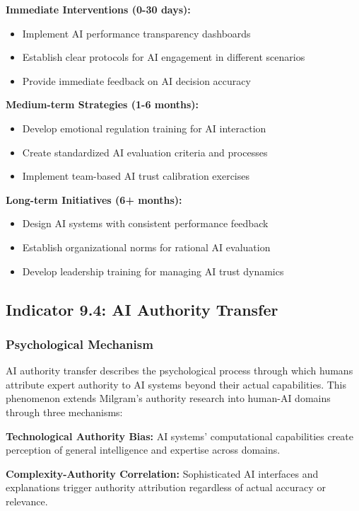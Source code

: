 \documentclass[11pt,a4paper]{article}
\begin{document}
\textbf{Immediate Interventions (0-30 days):}
\begin{itemize}
\item Implement AI performance transparency dashboards
\item Establish clear protocols for AI engagement in different scenarios
\item Provide immediate feedback on AI decision accuracy
\end{itemize}

\textbf{Medium-term Strategies (1-6 months):}
\begin{itemize}
\item Develop emotional regulation training for AI interaction
\item Create standardized AI evaluation criteria and processes
\item Implement team-based AI trust calibration exercises
\end{itemize}

\textbf{Long-term Initiatives (6+ months):}
\begin{itemize}
\item Design AI systems with consistent performance feedback
\item Establish organizational norms for rational AI evaluation
\item Develop leadership training for managing AI trust dynamics
\end{itemize}

\subsection{Indicator 9.4: AI Authority Transfer}

\subsubsection{Psychological Mechanism}

AI authority transfer describes the psychological process through which humans attribute expert authority to AI systems beyond their actual capabilities. This phenomenon extends Milgram's\cite{milgram1974} authority research into human-AI domains through three mechanisms:

\textbf{Technological Authority Bias:} AI systems' computational capabilities create perception of general intelligence and expertise across domains\cite{lee2018}.

\textbf{Complexity-Authority Correlation:} Sophisticated AI interfaces and explanations trigger authority attribution regardless of actual accuracy or relevance\cite{wang2019}.
\end{document}
